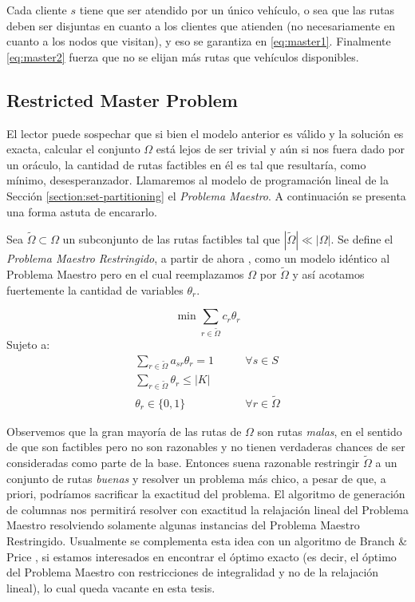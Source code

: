 Cada cliente $s$ tiene que ser atendido por un único vehículo, o sea que las rutas deben ser disjuntas en cuanto a los clientes que atienden (no necesariamente en cuanto a los nodos que visitan), y eso se garantiza en \ref{eq:master1}. Finalmente \ref{eq:master2} fuerza que no se elijan más rutas que vehículos disponibles.

\subsection{Restricted Master Problem}
\label{section:rmp}

El lector puede sospechar que si bien el modelo anterior es válido y la solución es exacta, calcular el conjunto $\Omega$ está lejos de ser trivial y aún si nos fuera dado por un oráculo, la cantidad de rutas factibles en él es tal que resultaría, como mínimo, desesperanzador. Llamaremos al modelo de programación lineal de la Sección \ref{section:set-partitioning} el \emph{Problema Maestro}. A continuación se presenta una forma astuta de encararlo.

Sea $\tilde{\Omega} \subset \Omega$ un subconjunto de las rutas factibles  tal que $|\tilde{\Omega}| \ll |\Omega|$. Se define el \emph{Problema Maestro Restringido}, a partir de ahora , como un modelo idéntico al Problema Maestro pero en el cual reemplazamos $\Omega$ por $\tilde{\Omega}$ y así acotamos fuertemente la cantidad de variables $\theta_r$. 

\begin{equation}
    \min \sum_{r \in \tilde{\Omega}} c_r  \theta_r
\end{equation}
Sujeto a:
\begin{align}
    \sum_{r \in \tilde{\Omega}} {a_{sr}\theta_r} = 1
\qquad & \forall {s \in S} \label{eq:rmp1} \\
\sum_{r \in \tilde{\Omega}}{\theta_r} \leq |K| & \label{eq:rmp2} \\
\theta_r \in \{0, 1\} \qquad & \forall{r \in \tilde{\Omega}}
\end{align}

Observemos que la gran mayoría de las rutas de $\Omega$ son rutas \emph{malas}, en el sentido de que son factibles pero no son razonables y no tienen verdaderas chances de ser consideradas como parte de la base. Entonces suena razonable restringir $\tilde{\Omega}$ a un conjunto de rutas \emph{buenas} y resolver un problema más chico, a pesar de que, a priori, podríamos sacrificar la exactitud del problema. El algoritmo de generación de columnas nos permitirá resolver con exactitud la relajación lineal del Problema Maestro resolviendo solamente algunas instancias del Problema Maestro Restringido. Usualmente se complementa esta idea con un algoritmo de Branch \& Price \cite{branch-and-price-source}, si estamos interesados en encontrar el óptimo exacto (es decir, el óptimo del Problema Maestro con restricciones de integralidad y no de la relajación lineal), lo cual queda vacante en esta tesis.	

